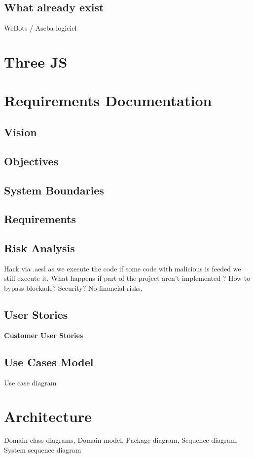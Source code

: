 \documentclass{scrartcl}
\begin{document}
\subsection{What already exist} 
WeBots / Aseba logiciel
\section{Three JS}

\section{Requirements Documentation}
\subsection{Vision}
\subsection{Objectives}
\subsection{System Boundaries}
\subsection{Requirements}
\subsection{Risk Analysis}
Hack via .aesl as we execute the code if some code with malicious is feeded we still execute it.
What happens if part of the project aren't implemented ? How to bypass blockade? Security?
No financial risks.
\subsection{User Stories}
\textbf{\large Customer User Stories}

\subsection{Use Cases Model}
Use case diagram

\section{Architecture}
Domain class diagrams,
Domain model,
Package diagram,
Sequence diagram,
System sequence diagram
\end{document}
